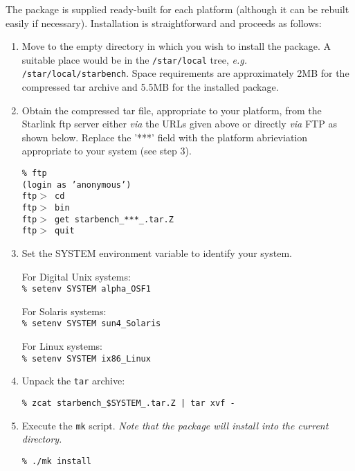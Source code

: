 
\pagebreak
The package is supplied ready-built for each platform (although it can
be rebuilt easily if necessary). Installation is straightforward and
proceeds as follows:

\begin{enumerate}
\item Move to the empty directory in which you wish to install the package.
A suitable place would be in the {\tt /star/local} tree, {\em e.g.} 
{\tt /star/local/starbench}. Space requirements are approximately 2MB for
the compressed tar archive and 5.5MB for the installed package.

\item Obtain the compressed tar file, appropriate to your platform, from
the Starlink ftp server either {\em via} the URLs given above or
directly {\em via} FTP as shown below. Replace the '***' field with the 
platform abrieviation appropriate to your system (see step 3).

{\tt    \% ftp \pkgftpsrv            \\
        (login as 'anonymous')                 \\
        ftp$>$ cd \pkgftpdir                   \\
        ftp$>$ bin                             \\
        ftp$>$ get starbench\_***\_\pkgver.tar.Z   \\
        ftp$>$ quit }

\item Set the SYSTEM environment variable to identify your system. 

For Digital Unix systems: \\
{\tt \% setenv SYSTEM alpha\_OSF1}

For Solaris systems: \\
{\tt \% setenv SYSTEM sun4\_Solaris}

For Linux systems: \\
{\tt \% setenv SYSTEM ix86\_Linux}

\item Unpack the {\tt tar} archive:

{\tt \% zcat starbench\_\$SYSTEM\_\pkgver.tar.Z | tar xvf - }

\item Execute the {\tt mk} script. {\em Note that the package will
install into the current directory.}

{\tt \% ./mk install}
\end{enumerate}

